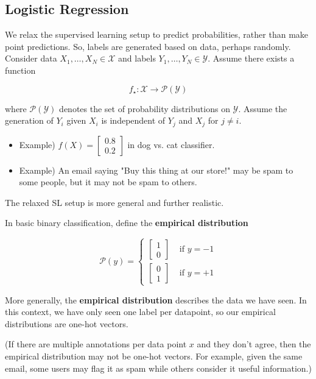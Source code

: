 \subsection{Logistic Regression}

\begin{concept}
    We relax the supervised learning setup to predict probabilities, rather than make point predictions.
    So, labels are generated based on data, perhaps randomly.
    Consider data $X_{1}, \ldots, X_{N} \in \mathcal{X}$ and labels $Y_{1}, \ldots, Y_{N} \in \mathcal{Y}$. Assume there exists a function

    $$
    f_{\star}: \mathcal{X} \rightarrow \mathcal{P}(\mathcal{Y})
    $$

    where $\mathcal{P}(\mathcal{Y})$ denotes the set of probability distributions on $\mathcal{Y}$.
    Assume the generation of $Y_{i}$ given $X_{i}$ is independent of $Y_{j}$ and $X_{j}$ for $j \neq i$.

    \begin{itemize}
        \item Example) $f(X)=\left[\begin{array}{l}0.8 \\ 0.2\end{array}\right]$ in dog vs. cat classifier.
        \item Example) An email saying "Buy this thing at our store!" may be spam to some people, but it may not be spam to others.
    \end{itemize}

    The relaxed SL setup is more general and further realistic.
\end{concept}

\begin{definition}
    In basic binary classification, define the \textbf{empirical distribution}

    $$
    \mathcal{P}(y)= \begin{cases}{\left[\begin{array}{l}
    1 \\
    0
    \end{array}\right]} & \text { if } y=-1 \\
    {\left[\begin{array}{l}
    0 \\
    1
    \end{array}\right]} & \text { if } y=+1\end{cases}
    $$

    More generally, the \textbf{empirical distribution} describes the data we have seen.
    In this context, we have only seen one label per datapoint, so our empirical distributions are one-hot vectors.

    (If there are multiple annotations per data point $x$ and they don't agree, then the empirical distribution may not be one-hot vectors.
    For example, given the same email, some users may flag it as spam while others consider it useful information.)
\end{definition}

